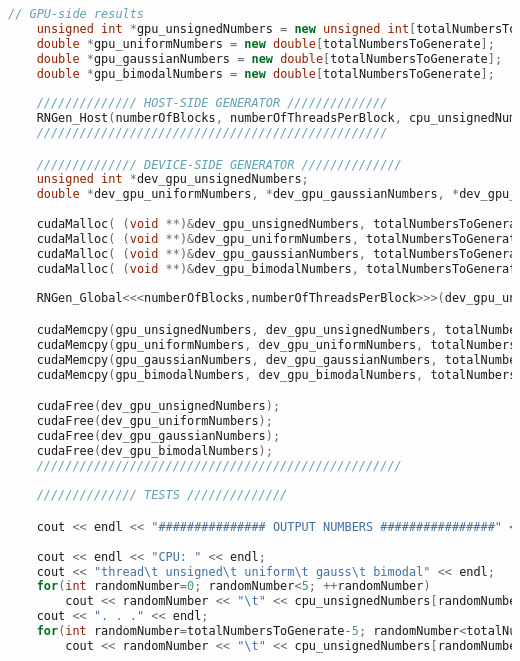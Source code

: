 \begin{lstlisting}[language=C++, caption={\texttt{libraries/CoreLibraries/RandomGenerator/OutputTest.cu}}]
	// GPU-side results
	unsigned int *gpu_unsignedNumbers = new unsigned int[totalNumbersToGenerate];
	double *gpu_uniformNumbers = new double[totalNumbersToGenerate];
	double *gpu_gaussianNumbers = new double[totalNumbersToGenerate];
	double *gpu_bimodalNumbers = new double[totalNumbersToGenerate];
	
	////////////// HOST-SIDE GENERATOR //////////////
	RNGen_Host(numberOfBlocks, numberOfThreadsPerBlock, cpu_unsignedNumbers, cpu_uniformNumbers, cpu_gaussianNumbers, cpu_bimodalNumbers, totalNumbersToGenerate, numbersToGeneratePerThread, seed);
	/////////////////////////////////////////////////

	////////////// DEVICE-SIDE GENERATOR //////////////
	unsigned int *dev_gpu_unsignedNumbers;
	double *dev_gpu_uniformNumbers, *dev_gpu_gaussianNumbers, *dev_gpu_bimodalNumbers;
	
	cudaMalloc( (void **)&dev_gpu_unsignedNumbers, totalNumbersToGenerate*sizeof(unsigned int) );
	cudaMalloc( (void **)&dev_gpu_uniformNumbers, totalNumbersToGenerate*sizeof(double) );
	cudaMalloc( (void **)&dev_gpu_gaussianNumbers, totalNumbersToGenerate*sizeof(double) );
	cudaMalloc( (void **)&dev_gpu_bimodalNumbers, totalNumbersToGenerate*sizeof(double) );
	
	RNGen_Global<<<numberOfBlocks,numberOfThreadsPerBlock>>>(dev_gpu_unsignedNumbers, dev_gpu_uniformNumbers, dev_gpu_gaussianNumbers, dev_gpu_bimodalNumbers, totalNumbersToGenerate, numbersToGeneratePerThread, seed);

	cudaMemcpy(gpu_unsignedNumbers, dev_gpu_unsignedNumbers, totalNumbersToGenerate*sizeof(unsigned int), cudaMemcpyDeviceToHost);
	cudaMemcpy(gpu_uniformNumbers, dev_gpu_uniformNumbers, totalNumbersToGenerate*sizeof(double), cudaMemcpyDeviceToHost);
	cudaMemcpy(gpu_gaussianNumbers, dev_gpu_gaussianNumbers, totalNumbersToGenerate*sizeof(double), cudaMemcpyDeviceToHost);
	cudaMemcpy(gpu_bimodalNumbers, dev_gpu_bimodalNumbers, totalNumbersToGenerate*sizeof(double), cudaMemcpyDeviceToHost);

	cudaFree(dev_gpu_unsignedNumbers);
	cudaFree(dev_gpu_uniformNumbers);
	cudaFree(dev_gpu_gaussianNumbers);
	cudaFree(dev_gpu_bimodalNumbers);
	///////////////////////////////////////////////////
	
	////////////// TESTS //////////////

	cout << endl << "############### OUTPUT NUMBERS ################" << endl;
	
	cout << endl << "CPU: " << endl;
	cout << "thread\t unsigned\t uniform\t gauss\t bimodal" << endl;
	for(int randomNumber=0; randomNumber<5; ++randomNumber)
		cout << randomNumber << "\t" << cpu_unsignedNumbers[randomNumber] << "\t" << cpu_uniformNumbers[randomNumber] << "\t" << cpu_gaussianNumbers[randomNumber] << "\t" << cpu_bimodalNumbers[randomNumber] << endl;;
	cout << ". . ." << endl;	
	for(int randomNumber=totalNumbersToGenerate-5; randomNumber<totalNumbersToGenerate; ++randomNumber)
		cout << randomNumber << "\t" << cpu_unsignedNumbers[randomNumber] << "\t" << cpu_uniformNumbers[randomNumber] << "\t" << cpu_gaussianNumbers[randomNumber] << "\t" << cpu_bimodalNumbers[randomNumber] << endl;
		

\end{lstlisting}
